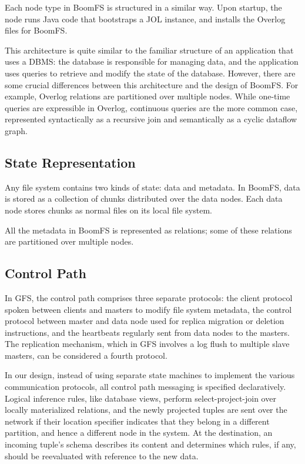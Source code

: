 \documentclass[twocolumn]{article}
\begin{document}
Each node type in BoomFS is structured in a similar way. Upon startup,
the node runs Java code that bootstraps a JOL instance, and installs
the Overlog files for BoomFS.

This architecture is quite similar to the familiar structure of an
application that uses a DBMS: the database is responsible for managing
data, and the application uses queries to retrieve and modify the
state of the database. However, there are some crucial differences
between this architecture and the design of BoomFS. For example,
Overlog relations are partitioned over multiple nodes.  While one-time
queries are expressible in Overlog, continuous queries are the more
common case, represented syntactically as a recursive join and
semantically as a cyclic dataflow graph.

\subsection{State Representation}
Any file system contains two kinds of state: data and metadata. In
BoomFS, data is stored as a collection of chunks distributed over the
data nodes. Each data node stores chunks as normal files on its
local file system.

All the metadata in BoomFS is represented as relations; some of these
relations are partitioned over multiple nodes.

\subsection{Control Path}
\label{control-path}
In GFS, the control path comprises three separate protocols: the
client protocol spoken between clients and masters to modify
file system metadata, the control protocol between master and data node
used for replica migration or deletion instructions, and the
heartbeats regularly sent from data nodes to the masters.  The
replication mechanism, which in GFS involves a log flush to multiple
slave masters, can be considered a fourth protocol.

In our design, instead of using separate state machines to implement
the various communication protocols, all control path messaging is
specified declaratively.  Logical inference rules, like database
views, perform select-project-join over locally materialized
relations, and the newly projected tuples are sent over the network if
their location specifier indicates that they belong in a different
partition, and hence a different node in the system.  At the
destination, an incoming tuple's schema describes its content and
determines which rules, if any, should be reevaluated with reference
to the new data.
\end{document}
